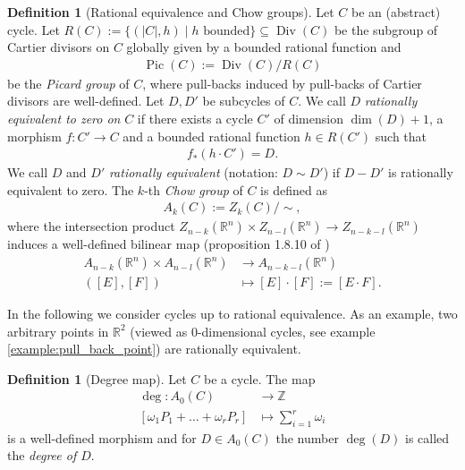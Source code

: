 \documentclass[11pt,reqno,a4]{amsart}
\theoremstyle{dotless}
\theoremstyle{definition}
\newtheorem{definition}[corollary]{Definition}
\begin{document}
\begin{definition}[Rational equivalence and Chow groups]
Let $C$ be an (abstract) cycle. Let $R(C):=\{(|C|,h)\mid h \textrm { bounded}\}\subseteq\operatorname{Div}(C)$ be the subgroup of Cartier divisors on $C$ globally given by a bounded rational function and
\begin{align*}
\operatorname{Pic}(C):=\operatorname{Div}(C)/R(C)
\end{align*}
be the \textit{Picard group} of $C$, where pull-backs induced by pull-backs of Cartier divisors are well-defined. Let $D,D'$ be subcycles of $C$. We call $D$ \textit{rationally equivalent to zero on} $C$ if there exists a cycle $C'$ of dimension $\operatorname{dim}(D)+1$, a morphism $f:C'\to C$ and a bounded rational function $h\in R(C')$ such that
\begin{align*}
f_*(h\cdot C')=D.
\end{align*}
We call $D$ and $D'$ \textit{rationally equivalent} (notation: $D \sim D'$) if $D-D'$ is rationally equivalent to zero. The $k$-th \textit{Chow group} of $C$ is defined as
\begin{align*}
A_k(C):=Z_k(C)/\sim,
\end{align*}
where the intersection product $Z_{n-k}(\mathbb{R}^n)\times Z_{n-l}(\mathbb{R}^n)\to Z_{n-k-l}(\mathbb{R}^n)$ induces a well-defined bilinear map (proposition 1.8.10 of \cite{Allermann})
\begin{align*}
A_{n-k}(\mathbb{R}^n)\times A_{n-l}(\mathbb{R}^n) &\to A_{n-k-l}(\mathbb{R}^n)\\
([E],[F]) &\mapsto [E]\cdot [F]:=[E\cdot F].
\end{align*}
\end{definition}


In the following we consider cycles up to rational equivalence. As an example, two arbitrary points in $\mathbb{R}^2$ (viewed as $0$-dimensional cycles, see example \ref{example:pull_back_point}) are rationally equivalent.


\begin{definition}[Degree map]
Let $C$ be a cycle. The map
\begin{align*}
\operatorname{deg}:A_0(C) &\to \mathbb{Z}\\
[\omega_1 P_1+\dots+\omega_r P_r] &\mapsto \sum_{i=1}^r \omega_i
\end{align*}
is a well-defined morphism and for $D\in A_0(C)$ the number $\operatorname{deg}(D)$ is called the \textit{degree of $D$}. 
\end{definition}
\end{document}
